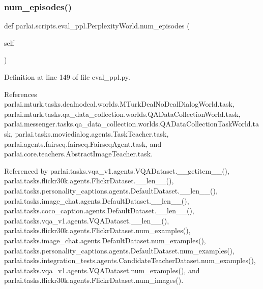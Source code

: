 \subsubsection{\texorpdfstring{num\+\_\+episodes()}{num\_episodes()}}
{\footnotesize\ttfamily def parlai.\+scripts.\+eval\+\_\+ppl.\+Perplexity\+World.\+num\+\_\+episodes (\begin{DoxyParamCaption}\item[{}]{self }\end{DoxyParamCaption})}



Definition at line 149 of file eval\+\_\+ppl.\+py.



References parlai.\+mturk.\+tasks.\+dealnodeal.\+worlds.\+M\+Turk\+Deal\+No\+Deal\+Dialog\+World.\+task, parlai.\+mturk.\+tasks.\+qa\+\_\+data\+\_\+collection.\+worlds.\+Q\+A\+Data\+Collection\+World.\+task, parlai.\+messenger.\+tasks.\+qa\+\_\+data\+\_\+collection.\+worlds.\+Q\+A\+Data\+Collection\+Task\+World.\+task, parlai.\+tasks.\+moviedialog.\+agents.\+Task\+Teacher.\+task, parlai.\+agents.\+fairseq.\+fairseq.\+Fairseq\+Agent.\+task, and parlai.\+core.\+teachers.\+Abstract\+Image\+Teacher.\+task.



Referenced by parlai.\+tasks.\+vqa\+\_\+v1.\+agents.\+V\+Q\+A\+Dataset.\+\_\+\+\_\+getitem\+\_\+\+\_\+(), parlai.\+tasks.\+flickr30k.\+agents.\+Flickr\+Dataset.\+\_\+\+\_\+len\+\_\+\+\_\+(), parlai.\+tasks.\+personality\+\_\+captions.\+agents.\+Default\+Dataset.\+\_\+\+\_\+len\+\_\+\+\_\+(), parlai.\+tasks.\+image\+\_\+chat.\+agents.\+Default\+Dataset.\+\_\+\+\_\+len\+\_\+\+\_\+(), parlai.\+tasks.\+coco\+\_\+caption.\+agents.\+Default\+Dataset.\+\_\+\+\_\+len\+\_\+\+\_\+(), parlai.\+tasks.\+vqa\+\_\+v1.\+agents.\+V\+Q\+A\+Dataset.\+\_\+\+\_\+len\+\_\+\+\_\+(), parlai.\+tasks.\+flickr30k.\+agents.\+Flickr\+Dataset.\+num\+\_\+examples(), parlai.\+tasks.\+image\+\_\+chat.\+agents.\+Default\+Dataset.\+num\+\_\+examples(), parlai.\+tasks.\+personality\+\_\+captions.\+agents.\+Default\+Dataset.\+num\+\_\+examples(), parlai.\+tasks.\+integration\+\_\+tests.\+agents.\+Candidate\+Teacher\+Dataset.\+num\+\_\+examples(), parlai.\+tasks.\+vqa\+\_\+v1.\+agents.\+V\+Q\+A\+Dataset.\+num\+\_\+examples(), and parlai.\+tasks.\+flickr30k.\+agents.\+Flickr\+Dataset.\+num\+\_\+images().

